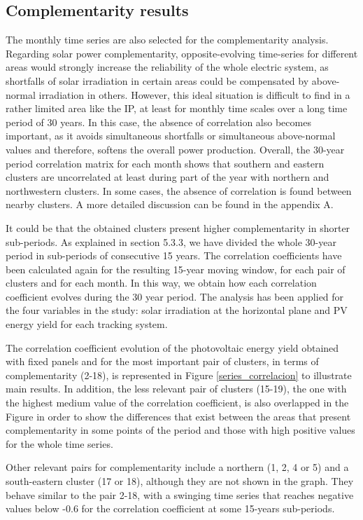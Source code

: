 \subsection{Complementarity results}

The monthly time series are also selected for the complementarity analysis.
Regarding solar power complementarity, opposite-evolving time-series for different areas would strongly increase the reliability of the whole electric system, as shortfalls of solar irradiation in certain areas could be compensated by above-normal irradiation in others. However, this ideal situation is difficult to find in a rather limited area like the IP, at least for monthly time scales over a long time period of 30 years. In this case, the absence of correlation also becomes important, as it avoids simultaneous shortfalls or simultaneous above-normal values and therefore, softens the overall power production. Overall, the 30-year period correlation matrix for each month shows that southern and eastern clusters are uncorrelated at least during part of the year with northern and northwestern clusters. In some cases, the absence of correlation is found between nearby clusters. A more detailed discussion can be found in the appendix A.

It could be that the obtained clusters present higher complementarity in shorter sub-periods. As explained in section 5.3.3, we have divided the whole 30-year period in sub-periods of consecutive 15 years. The correlation coefficients have been calculated again for the resulting 15-year moving window, for each pair of clusters and for each month. In this way, we obtain how each correlation coefficient evolves during the 30 year period. The analysis has been applied for the four variables in the study: solar irradiation at the horizontal plane and PV energy yield for each tracking system.

The correlation coefficient evolution of the photovoltaic energy yield obtained with fixed panels and for the most important pair of clusters, in terms of complementarity (2-18), is represented in Figure \ref{series_correlacion} to illustrate main results. In addition, the less relevant pair of clusters (15-19), the one with the highest medium value of the correlation coefficient, is also overlapped in the Figure in order to show the differences that exist between the areas that present complementarity in some points of the period and those with high positive values for the whole time series.

Other relevant pairs for complementarity include a northern (1, 2, 4 or 5) and a south-eastern cluster (17 or 18),  although they are not shown in the graph. They behave similar to the pair 2-18, with a swinging time series that reaches negative values below -0.6 for the correlation coefficient at some 15-years sub-periods. 

